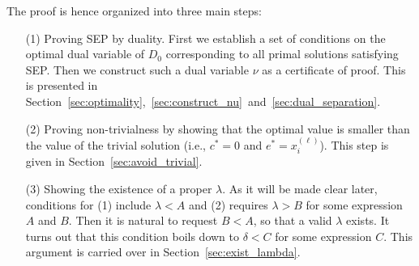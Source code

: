 \documentclass[twoside,11pt]{article}
\numberwithin{equation}{section}
\begin{document}
The proof  is hence organized into three main steps:
\begin{enumerate}
  \item[(1)] Proving SEP by duality. First we establish a set of conditions on the optimal dual variable of $D_0$ corresponding to all primal solutions satisfying SEP. Then  we construct such a dual variable $\nu$ as a certificate of proof. This is presented in Section~\ref{sec:optimality},~\ref{sec:construct_nu}~and~\ref{sec:dual_separation}.
  \item[(2)] Proving non-trivialness by showing that the optimal value is smaller than the value of the trivial solution (i.e., $c^*=0$ and $e^*=x_i^{(\ell)}$). This step is given in Section~\ref{sec:avoid_trivial}.
  \item[(3)] Showing the existence of a proper $\lambda$. As it will be made clear later, conditions for (1) include $\lambda<A$ and (2) requires $\lambda>B$ for some expression $A$ and $B$. Then it is natural to request $B<A$, so that a valid $\lambda$ exists. It turns out that this condition boils down to $\delta<C$ for some expression $C$. This argument is carried over in Section~\ref{sec:exist_lambda}.
\end{enumerate}

\end{document}
